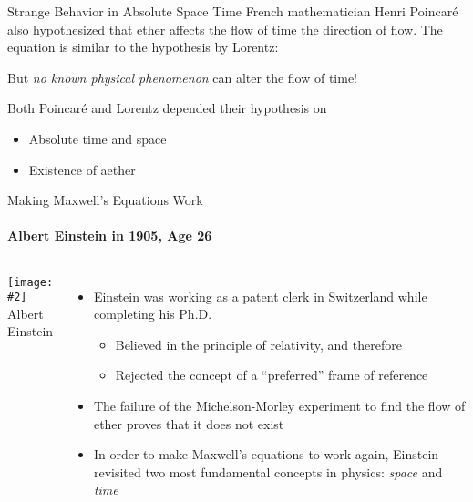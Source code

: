 \documentclass[12pt,compress,aspectratio=169]{beamer}
\newcommand{\pic}[2]{\texttt{[image: \#2]}}
\newcommand{\bigsqrt}{\ensuremath\sqrt{1-\left(\frac{v}{c}\right)^2}}
\newcommand{\eq}[2]{\vspace{#1}{\Large\begin{displaymath}#2\end{displaymath}}}
\begin{document}
\begin{frame}{Strange Behavior in Absolute Space Time}
  French mathematician Henri Poincar\'{e} also hypothesized that ether affects
  the flow of time the direction of flow. The equation is similar to the
  hypothesis by Lorentz:

  \eq{-.2in}{
    \boxed{t' =\frac{t}{\bigsqrt}}
  }
  
  But \emph{no known physical phenomenon} can alter the flow of time!
  
  \vspace{.1in}Both Poincar\'{e} and Lorentz depended their hypothesis on
  \begin{itemize}
  \item Absolute time and space
  \item Existence of aether
  \end{itemize}
\end{frame}

\begin{frame}{Making Maxwell's Equations Work}
  \framesubtitle{Albert Einstein in 1905, Age 26}
  \begin{columns}
    \pic{1.1}{graphics/Einstein_patentoffice.jpg}\\
    {\footnotesize Albert Einstein}
  
    \begin{itemize}
    \item Einstein was working as a patent clerk in Switzerland while completing
      his Ph.D.
      \begin{itemize}
      \item Believed in the principle of relativity, and therefore
      \item Rejected the concept of a ``preferred'' frame of reference
      \end{itemize}
    \item The failure of the Michelson-Morley experiment to find the flow of
      ether proves that it does not exist
    \item In order to make Maxwell's equations to work again, Einstein
      revisited two most fundamental concepts in physics: \emph{space} and
      \emph{time}
    \end{itemize}
  \end{columns}
\end{frame}
\end{document}
